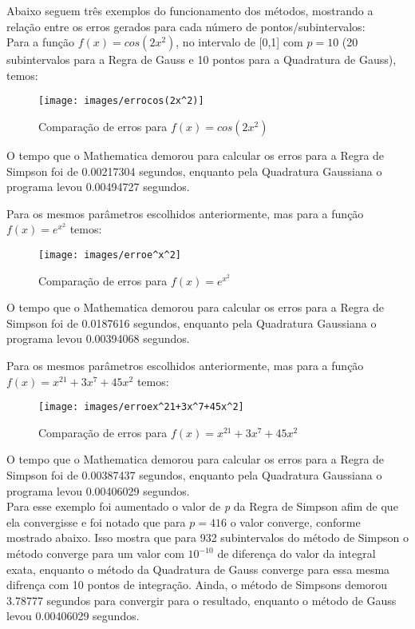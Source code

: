 \documentclass[12pt,a4paper]{article}
\begin{document}
\quad Abaixo seguem três exemplos do funcionamento dos métodos, mostrando a relação entre os erros gerados para cada número de pontos/subintervalos:\\

\quad Para a função $f(x)=cos(2x^2)$, no intervalo de [0,1] com $p=10$ (20 subintervalos para a Regra de Gauss e 10 pontos para a Quadratura de Gauss), temos:

\begin{figure}[h]
\texttt{[image: images/errocos(2x^2)]}
\caption{Comparação de erros para $f(x)=cos(2x^2)$}
\end{figure}

\qquad O tempo que o Mathematica demorou para calcular os erros para a Regra de Simpson foi de 0.00217304 segundos, enquanto pela Quadratura Gaussiana o programa levou 0.00494727 segundos.


\newpage
\qquad Para os mesmos parâmetros escolhidos anteriormente, mas para a função $f(x)=e^{x^{2}}$ temos:


\begin{figure}[h]
\texttt{[image: images/erroe^x^2]}
\caption{Comparação de erros para $f(x)=e^{x^{2}}$}
\end{figure}

\qquad O tempo que o Mathematica demorou para calcular os erros para a Regra de Simpson foi de 0.0187616 segundos, enquanto pela Quadratura Gaussiana o programa levou 0.00394068 segundos.

\newpage
\qquad Para os mesmos parâmetros escolhidos anteriormente, mas para a função $f(x)=x^{21} + 3 x^7 + 45 x^2$ temos:

\begin{figure}[h]
\texttt{[image: images/erroex^21+3x^7+45x^2]}
\caption{Comparação de erros para $f(x)=x^{21}+3x^7+45x^2$}
\end{figure}

\qquad O tempo que o Mathematica demorou para calcular os erros para a Regra de Simpson foi de 0.00387437 segundos, enquanto pela Quadratura Gaussiana o programa levou 0.00406029 segundos.\\

\newpage
\qquad Para esse exemplo foi aumentado o valor de \textit{p} da Regra de Simpson afim de que ela convergisse e foi notado que para $p=416$ o valor converge, conforme mostrado abaixo. Isso mostra que para 932 subintervalos do método de Simpson o método converge para um valor com $10^{-10}$ de diferença do valor da integral exata, enquanto o método da Quadratura de Gauss converge para essa mesma difrença com 10 pontos de integração. Ainda, o método de Simpsons demorou 3.78777 segundos para convergir para o resultado, enquanto o método de Gauss levou 0.00406029 segundos.
\end{document}
